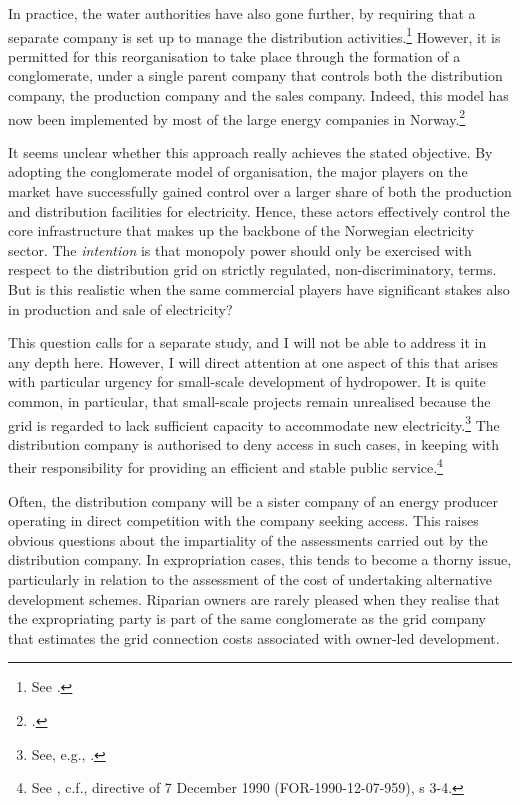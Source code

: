 In practice, the water authorities have also gone further, by requiring that a separate company is set up to manage the distribution activities.\footnote{See \cite[581-582]{bibow03}.} However, it is permitted for this reorganisation to take place through the formation of a conglomerate, under a single parent company that controls both the distribution company, the production company and the sales company. Indeed, this model has now been implemented by most of the large energy companies in Norway.\footcite[582]{bibow03}

It seems unclear whether this approach really achieves the stated objective. By adopting the conglomerate model of organisation, the major players on the market have successfully gained control over a larger share of both the production and distribution facilities for electricity. Hence, these actors effectively control the core infrastructure that makes up the backbone of the Norwegian electricity sector. The {\it intention} is that monopoly power should only be exercised with respect to the distribution grid on strictly regulated, non-discriminatory, terms. But is this realistic when the same commercial players have significant stakes also in production and sale of electricity?

This question calls for a separate study, and I will not be able to address it in any depth here. However, I will direct attention at one aspect of this that arises with particular urgency for small-scale development of hydropower. It is quite common, in particular, that small-scale projects remain unrealised because the grid is regarded to lack sufficient capacity to accommodate new electricity.\footnote{See, e.g., \cite[84,161-162]{nou129}.} The distribution company is authorised to deny access in such cases, in keeping with their responsibility for providing an efficient and stable public service.\footnote{See \cite[3-4]{ea90}, c.f., directive of 7 December 1990 (FOR-1990-12-07-959), s 3-4.}

Often, the distribution company will be a sister company of an energy producer operating in direct competition with the company seeking access. This raises obvious questions about the impartiality of the assessments carried out by the distribution company. In expropriation cases, this tends to become a thorny issue, particularly in relation to the assessment of the cost of undertaking alternative development schemes. Riparian owners are rarely pleased when they realise that the expropriating party is part of the same conglomerate as the grid company that estimates the grid connection costs associated with owner-led development.

